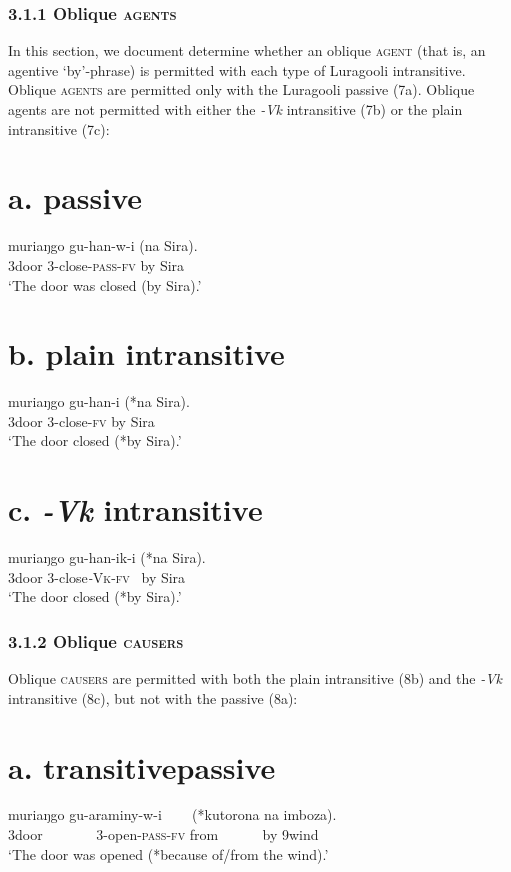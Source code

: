 \documentclass[output=paper]{langsci/langscibook}
\begin{document}
\begin{styleTabellenberschrift}
\subsection{3.1.1 Oblique \textsc{agents} }

In this section, we document determine whether an oblique \textsc{agent} (that is, an agentive ‘by’-phrase) is permitted with each type of Luragooli intransitive. Oblique \textsc{agents} are permitted only with the Luragooli passive (7a). Oblique agents are not permitted with either the \textit{{}-Vk} intransitive (7b) or the plain intransitive (7c):

\chapter[  a. passive]{  a. \textbf{passive}}
\gll muriaŋgo gu-han-w-i            (na Sira).\\
     3door       3-close-\textsc{pass}{}-\textsc{fv}    by  Sira\\
\glt ‘The door was closed (by Sira).’
\z

\chapter[  b. plain intransitive]{  b.\textbf{ plain intransitive}}
\gll muriaŋgo gu-han-i   (*na Sira).\\
     3door      3-close-\textsc{fv}   by   Sira\\
\glt ‘The door closed (*by Sira).’
\z

\chapter[  c. {}-Vk intransitive]{\textbf{  }c. \textbf{\textit{{}-Vk}}\textbf{ intransitive}}
\gll muriaŋgo gu-han-ik-i     (*na Sira).\\
     3door       3-close\textit{{}-}\textsc{Vk}{}-\textsc{fv}~ by  Sira\\
     ‘The door closed (*by Sira).’\\
\subsection{3.1.2 Oblique \textsc{causers}}

Oblique \textsc{causers} are permitted with both the plain intransitive (8b) and the \textit{{}-Vk} intransitive (8c), but not with the passive (8a):

\chapter[  a. transitivepassive]{  a. \textbf{transitive}\textbf{passive}}
\gll muriaŋgo gu-araminy-w-i ~~ ~(*kutorona na imboza).\\
     3door ~~~~~~~3-open-\textsc{pass}{}-\textsc{fv}      from ~~~~~ by 9wind\\
\glt ‘The door was opened (*because of/from the wind).’
\z


\end{styleTabellenberschrift}
\end{document}
